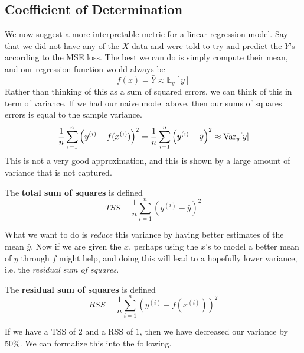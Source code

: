 \subsection{Coefficient of Determination} 

  We now suggest a more interpretable metric for a linear regression model. Say that we did not have any of the $X$ data and were told to try and predict the $Y$'s according to the MSE loss. The best we can do is simply compute their mean, and our regression function would always be 
  \begin{equation}
    f(x) = \bar{Y} \approx \mathbb{E}_y[y]
  \end{equation}
  Rather than thinking of this as a sum of squared errors, we can think of this in term of variance. If we had our naive model above, then our sums of squares errors is equal to the sample variance. 
  \begin{equation}
    \frac{1}{n} \sum_{i=1}^n \left( y^{(i)} - f(x^{(i)}) \right)^2 = \frac{1}{n} \sum_{i=1}^n \left( y^{(i)} - \bar{y} \right)^2  
    \approx \Var_y [y]
  \end{equation}
  This is not a very good approximation, and this is shown by a large amount of variance that is not captured. 

  \begin{definition}
    The \textbf{total sum of squares} is defined 
    \begin{equation}
      TSS = \frac{1}{n} \sum_{i=1}^n \left( y^{(i)} - \bar{y} \right)^2
    \end{equation}
  \end{definition} 

  What we want to do is \textit{reduce} this variance by having better estimates of the mean $\bar{y}$. Now if we are given the $x$, perhaps using the $x$'s to model a better mean of $y$ through $f$ might help, and doing this will lead to a hopefully lower variance, i.e. the \textit{residual sum of squares}. 

  \begin{definition}
    The \textbf{residual sum of squares} is defined 
    \begin{equation}
      RSS = \frac{1}{n} \sum_{i=1}^n \left( y^{(i)} - f(x^{(i)}) \right)^2 
    \end{equation}
  \end{definition} 

  If we have a TSS of $2$ and a RSS of $1$, then we have decreased our variance by 50\%. We can formalize this into the following. 


